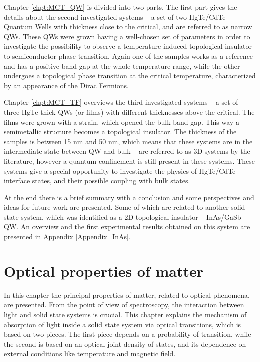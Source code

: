 \documentclass[titlepage,a4paper]{book}
\newcommand{\wciecie}{\quad\phantom{v}}
\begin{document}
Chapter \ref{chpt:MCT_QW} is divided into two parts. The first part gives the details about the second investigated systems -- a set of two HgTe/CdTe Quantum Wells with thickness close to the critical, and are referred to as narrow QWs. These QWs were grown having a well-chosen set of parameters in order to investigate the possibility to observe a temperature induced topological insulator-to-semiconductor phase transition. Again one of the samples works as a reference and has a positive band gap at the whole temperature range, while the other undergoes a topological phase transition at the critical temperature, characterized by an appearance of the Dirac Fermions. 

Chapter \ref{chpt:MCT_TF} overviews the third investigated systems -- a set of three HgTe thick QWs (or films) with different thicknesses above the critical. The films were grown with a strain, which opened the bulk band gap. This way a semimetallic structure becomes a topological insulator. The thickness of the samples is between 15 nm and 50 nm, which means that these systems are in the intermediate state between QW and bulk -- are referred to as 3D systems by the literature, however a quantum confinement is still present in these systems. These systems give a special opportunity to investigate the physics of HgTe/CdTe interface states, and their possible coupling with bulk states.

At the end there is a brief summary with a conclusion and some perspectives and ideas for future work are presented. Some of which are related to another solid state system, which was identified as a 2D topological insulator -- InAs/GaSb QW. An overview and the first experimental results obtained on this system are presented in Appendix \ref{Appendix_InAs}. 

\chapter{Optical properties of matter}
\label{chpt:optical}
\wciecie
In this chapter the principal properties of matter, related to optical phenomena, are presented. From the point of view of spectroscopy, the interaction between light and solid state systems is crucial. This chapter explains the mechanism of absorption of light inside a solid state system via optical transitions, which is based on two pieces. The first piece depends on a probability of transition, while the second is based on an optical joint density of states, and its dependence on external conditions like temperature and magnetic field. 
\end{document}

